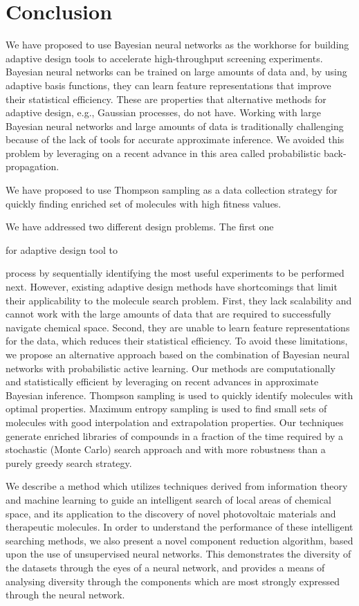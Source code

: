 \section{Conclusion}

We have proposed to use Bayesian neural networks as the workhorse for building adaptive design tools to accelerate high-throughput screening experiments. Bayesian neural networks can be trained on large amounts of data and, by using adaptive basis functions, they can learn feature representations that improve their statistical efficiency. These are properties that alternative methods for adaptive design, e.g., Gaussian processes, do not have. Working with large Bayesian neural networks and large amounts of data is traditionally challenging because of the lack of tools for accurate approximate inference. We avoided this problem by leveraging on a recent advance in this area called probabilistic back-propagation.

We have proposed to use Thompson sampling as a data collection strategy for quickly finding enriched set of molecules with high fitness values.

We have addressed two different design problems. The first one

for adaptive design tool to


process by sequentially identifying the most useful experiments to be performed
next. However, existing adaptive design methods have shortcomings that limit
their applicability to the molecule search problem. First, they lack
scalability and cannot work with the large amounts of data that are required to
successfully navigate chemical space. Second, they are unable to learn feature
representations for the data, which reduces their statistical efficiency. To
avoid these limitations, we propose an alternative approach based on the
combination of Bayesian neural networks with probabilistic active learning. Our
methods are computationally and statistically efficient by leveraging on recent
advances in approximate Bayesian inference. Thompson
sampling is used to quickly identify molecules with optimal properties.
Maximum entropy sampling is used
to find small sets of molecules with good interpolation and extrapolation properties.
Our techniques generate enriched libraries of compounds in a fraction
of the time required by a stochastic (Monte Carlo) search approach and with
more robustness than a purely greedy search strategy.

We describe a method which utilizes techniques derived from information theory and machine learning to guide an intelligent search of local areas of chemical space, and its application to the discovery of novel photovoltaic materials and therapeutic molecules.  In order to understand the performance of these intelligent searching methods, we also present a novel component reduction algorithm, based upon the use of unsupervised neural networks.  This demonstrates the diversity of the datasets through the eyes of a neural network, and provides a means of analysing diversity through the components which are most strongly expressed through the neural network.  

